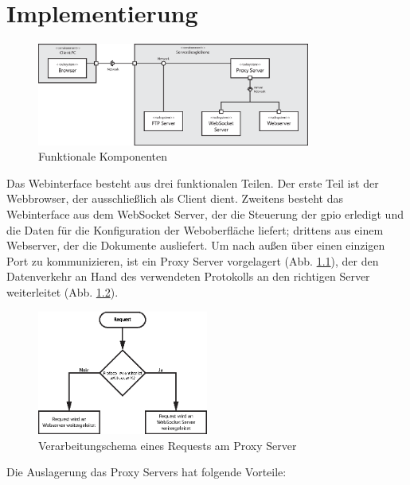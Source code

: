 \chapter{Implementierung}

\begin{figure}[ht]
\centering
\includegraphics[width = 0.8\textwidth]{documentation/images/components.eps}
\caption{Funktionale Komponenten}
\label{fig:functionalComponents}
\end{figure}

Das Webinterface besteht aus drei funktionalen Teilen. Der erste Teil ist der Webbrowser, der ausschließlich als Client dient. Zweitens besteht das Webinterface aus dem WebSocket Server, der die Steuerung der \gls{gpio} erledigt und die Daten für die Konfiguration der Weboberfläche liefert; drittens aus einem Webserver, der die Dokumente ausliefert. Um nach außen über einen einzigen Port zu kommunizieren, ist ein Proxy Server vorgelagert (Abb. \ref{fig:functionalComponents}), der den Datenverkehr an Hand des verwendeten Protokolls an den richtigen Server weiterleitet (Abb. \ref{fig:requestForwarding}).

\begin{figure}[ht]
\centering
\includegraphics[width = 0.5\textwidth]{documentation/images/request.eps}
\caption{Verarbeitungschema eines Requests am Proxy Server}
\label{fig:requestForwarding}
\end{figure}

\noindent Die Auslagerung das Proxy Servers hat folgende Vorteile:

